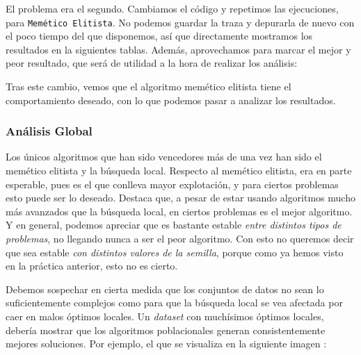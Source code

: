 \documentclass[11pt]{article}
\begin{document}
El problema era el segundo. Cambiamos el código y repetimos las ejecuciones, para \lstinline{Memético Elitista}. No podemos guardar la traza y depurarla de nuevo con el poco tiempo del que disponemos, así que directamente mostramos los resultados en la siguientes tablas. Además, aprovechamos para marcar el mejor y peor resultado, que será de utilidad a la hora de realizar los análisis:



Tras este cambio, vemos que el algoritmo memético elitista tiene el comportamiento deseado, con lo que podemos pasar a analizar los resultados.

\subsubsection{Análisis Global}

Los únicos algoritmos que han sido vencedores más de una vez han sido el memético elitista y la búsqueda local. Respecto al memético elitista, era en parte esperable, pues es el que conlleva mayor explotación, y para ciertos problemas esto puede ser lo deseado. Destaca que, a pesar de estar usando algoritmos mucho más avanzados que la búsqueda local, en ciertos problemas es el mejor algoritmo. Y en general, podemos apreciar que es bastante estable \emph{entre distintos tipos de problemas}, no llegando nunca a ser el peor algoritmo. Con esto no queremos decir que sea estable \emph{con distintos valores de la semilla}, porque como ya hemos visto en la práctica anterior, esto no es cierto.

Debemos sospechar en cierta medida que los conjuntos de datos no sean lo suficientemente complejos como para que la búsqueda local se vea afectada por caer en malos óptimos locales. Un \emph{dataset} con muchísimos óptimos locales, debería mostrar que los algoritmos poblacionales generan consistentemente mejores soluciones. Por ejemplo, el que se visualiza en la siguiente imagen \footnotemark:
\end{document}
